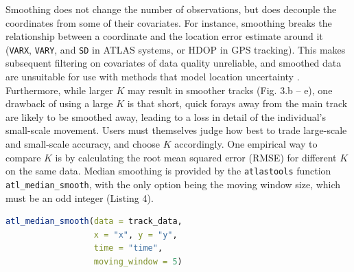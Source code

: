 \documentclass[10pt,paper=a4,headings=standardclasses
]{scrartcl}
\begin{document}
Smoothing does not change the number of observations, but does decouple the coordinates from some of their covariates.
For instance, smoothing breaks the relationship between a coordinate and the location error estimate around it (\texttt{VARX}, \texttt{VARY}, and \texttt{SD} in ATLAS systems, or HDOP in GPS tracking).
This makes subsequent filtering on covariates of data quality unreliable, and smoothed data are unsuitable for use with methods that model location uncertainty \citep{noonan2019, fleming2014a, fleming2020, calabrese2016}.
Furthermore, while larger $K$ may result in smoother tracks (Fig. 3.b -- e), one drawback of using a large $K$ is that short, quick forays away from the main track are likely to be smoothed away, leading to a loss in detail of the individual's small-scale movement.
Users must themselves judge how best to trade large-scale and small-scale accuracy, and choose $K$ accordingly.
One empirical way to compare $K$ is by calculating the root mean squared error (RMSE) for different $K$ on the same data.
Median smoothing is provided by the \texttt{atlastools} function \texttt{atl\_median\_smooth}, with the only option being the moving window size, which must be an odd integer (Listing 4).

\begin{lstlisting}[float, language=R, style=customR, caption = {
    Median smoothing a movement track using the function \texttt{atl\_median\_smooth} function with a moving window \textit{K = 5}. 
    Larger values of $K$ yield smoother tracks, but $K$ should always be some orders of magnitude lower than the number of observations.}]
atl_median_smooth(data = track_data,
                  x = "x", y = "y",
                  time = "time",
                  moving_window = 5)
\end{lstlisting}
\end{document}
